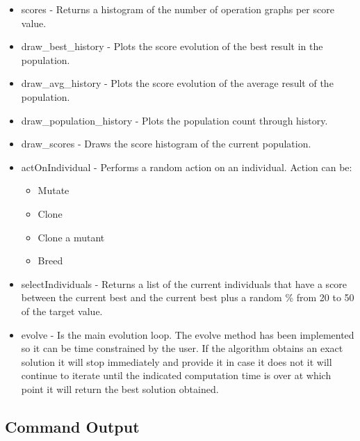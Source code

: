 \documentclass[a4paper,10pt,titlepage]{article}
\begin{document}
\begin{description}
\begin{itemize}
		\item scores - Returns a histogram of the number of operation graphs per score value. 
		\item draw\_best\_history - Plots the score evolution of the best result in the population. 
		\item draw\_avg\_history - Plots the score evolution of the average result of the population.
		\item draw\_population\_history - Plots the population count through history.
		\item draw\_scores - Draws the score histogram of the current population. 
		\item actOnIndividual - Performs a random action on an individual. Action can be:
		\begin{itemize}
			\item Mutate
			\item Clone
			\item Clone a mutant
			\item Breed
		\end{itemize}
		\item selectIndividuals - Returns a list of the current individuals that have a score between the current best and the current best plus a random \% from 20 to 50 of the target value. 
		\item evolve - Is the main evolution loop. The evolve method has been implemented so it can be time constrained by the user. If the algorithm obtains an exact solution it will stop immediately and provide it in case it does not it will continue to iterate until the indicated computation time is over at which point it will return the best solution obtained. 
	\end{itemize}
\end{description}	
		


\subsection{Command Output}
\end{document}
